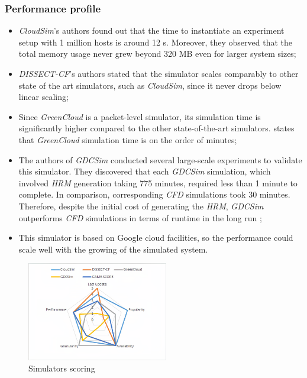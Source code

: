 {\subsubsection{Performance profile}
\begin{itemize}
    \item \emph{CloudSim}'s authors found out that the time to instantiate an experiment setup with 1 million hosts is around 12 s. Moreover, they observed that the total memory usage never grew beyond 320 MB even for larger system sizes;
    \item \emph{DISSECT-CF}'s authors stated that the simulator scales comparably to other state of the art simulators, such as \emph{CloudSim}, since it never drops below linear scaling;
    \item Since \emph{GreenCloud} is a packet-level simulator, its simulation time is significantly higher compared to the other state-of-the-art simulators. \cite{khalil2017cloud} states that \emph{GreenCloud} simulation time is on the order of minutes;
    \item The authors of \emph{GDCSim} conducted several large-scale experiments to validate this simulator. They discovered that each \emph{GDCSim} simulation, which involved \emph{HRM} generation taking 775 minutes, required less than 1 minute to complete. In comparison, corresponding \emph{CFD} simulations took 30 minutes. Therefore, despite the initial cost of generating the \emph{HRM}, \emph{GDCSim} outperforms \emph{CFD} simulations in terms of runtime in the long run \cite{gupta2014gdcsim};
    \item This simulator is based on Google cloud facilities, so the performance could scale well with the growing of the simulated system.
\end{itemize}

\begin{figure}[h]
    \centering
    \includegraphics[width=0.55\textwidth]{chapters/images/radar.png}
    \caption{Simulators scoring}
    \label{fig:radar}
\end{figure}

}

